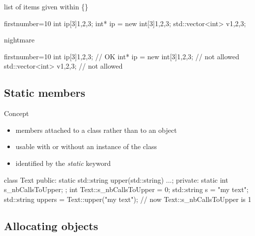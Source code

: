 \begin{frame}[fragile]
  \begin{exampleblock}{list of items given within \{\}}
    \begin{cppcode*}{firstnumber=10}
     int ip[3]{1,2,3};
     int* ip = new int[3]{1,2,3};
     std::vector<int> v{1,2,3};
    \end{cppcode*}
  \end{exampleblock}
  \pause
  \begin{block}{ nightmare}
    \begin{cppcode*}{firstnumber=10}
     int ip[3]{1,2,3};            // OK
     int* ip = new int[3]{1,2,3}; // not allowed
     std::vector<int> v{1,2,3};   // not allowed
    \end{cppcode*}
  \end{block}
\end{frame}

\subsection[Static]{Static members}

\begin{frame}[fragile]
  \begin{block}{Concept}
    \begin{itemize}
    \item members attached to a class rather than to an object
    \item usable with or without an instance of the class
    \item identified by the {\it static} keyword
    \end{itemize}
  \end{block}
  \begin{cppcode}
    class Text {
    public:
      static std::string upper(std::string) {...};
    private:
      static int s_nbCallsToUpper;
    };
    int Text::s_nbCallsToUpper = 0;
    std::string s = "my text";
    std::string uppers = Text::upper("my text");
    // now Text::s_nbCallsToUpper is 1
  \end{cppcode}
\end{frame}

\subsection[New]{Allocating objects}

